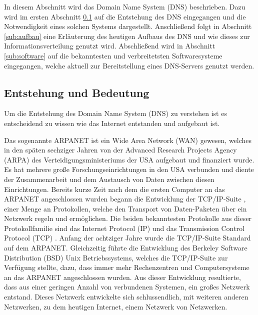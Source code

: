 \documentclass[a4paper, 12pt, BCOR10mm, DIV12, toc=bibliography, toc=listof, german]{scrbook}
\def \dns {Domain Name System (DNS)}
\begin{document}
		In diesem Abschnitt wird das \dns{} \cite{rfc1034,rfc1035} beschrieben. Dazu wird im ersten
		Abschnitt \ref{sub:entstehung} auf die Entstehung des DNS eingegangen und die Notwendigkeit
		eines solchen Systems dargestellt.  Anschließend folgt in Abschnitt \ref{sub:aufbau} eine
		Erläuterung des heutigen Aufbaus des DNS und wie dieses zur Informationsverteilung genutzt wird.
		Abschließend wird in Abschnitt \ref{sub:software} auf die bekanntesten und verbreitetsten
		Softwaresysteme eingegangen, welche aktuell zur Bereitstellung eines DNS-Servers genutzt werden.

			\subsection{Entstehung und Bedeutung} %
			\label{sub:entstehung}

			Um die Entstehung des \dns{} zu verstehen ist es entscheidend zu wissen wie das Internet
			entstanden und aufgebaut ist.
			
			Das sogenannte ARPANET ist ein Wide Area Network (WAN) gewesen, welches in den späten
			sechziger Jahren von der Advanced Research Projects Agency (ARPA) des
			Verteidigungsministeriums der USA aufgebaut und finanziert wurde. Es hat mehrere große
			Forschungseinrichtungen in den USA verbunden und diente der Zusammenarbeit und dem Austausch
			von Daten zwischen diesen Einrichtungen. Bereits kurze Zeit nach dem die ersten Computer an
			das ARPANET angeschlossen wurden begann die Entwicklung der TCP/IP-Suite \cite{stevens1994},
			einer Menge an Protokollen, welche den Transport von Daten-Paketen über ein Netzwerk regeln
			und ermöglichen.  Die beiden bekanntesten Protokolle aus dieser Protokollfamilie sind das
			Internet Protocol (IP) \cite{rfc791} und das Transmission Control Protocol (TCP)
			\cite{rfc793}. Anfang der achtziger Jahre wurde die TCP/IP-Suite Standard auf dem ARPANET.
			Gleichzeitig führte die Entwicklung des Berkeley Software Distribution (BSD) Unix
			Betriebssystems, welches die TCP/IP-Suite zur Verfügung stellte, dazu, dass immer mehr
			Rechenzentren und Computersysteme an das ARPANET angeschlossen wurden. Aus dieser Entwicklung
			resultierte, dass aus einer geringen Anzahl von verbundenen Systemen, ein großes Netzwerk
			entstand. Dieses Netzwerk entwickelte sich schlussendlich, mit weiteren anderen Netzwerken, zu
			dem heutigen Internet, einem Netzwerk von Netzwerken.
\end{document}
